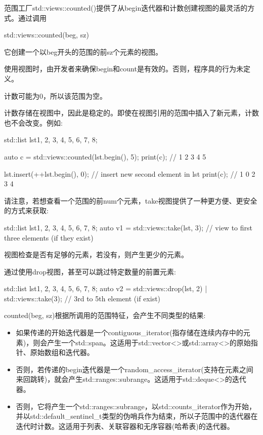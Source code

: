 
范围工厂std::views::counted()提供了从begin迭代器和计数创建视图的最灵活的方式。通过调用

\begin{cpp}
std::views::counted(beg, sz)
\end{cpp}

它创建一个以beg开头的范围的前sz个元素的视图。

使用视图时，由开发者来确保begin和count是有效的。否则，程序具的行为未定义。

计数可能为0，所以该范围为空。

计数存储在视图中，因此是稳定的。即使在视图引用的范围中插入了新元素，计数也不会改变。例如:

\begin{cpp}
std::list lst{1, 2, 3, 4, 5, 6, 7, 8};

auto c = std::views::counted(lst.begin(), 5);
print(c); // 1 2 3 4 5

lst.insert(++lst.begin(), 0); // insert new second element in lst
print(c); // 1 0 2 3 4
\end{cpp}

请注意，若想查看一个范围的前num个元素，take视图提供了一种更方便、更安全的方式来获取:

\begin{cpp}
std::list lst{1, 2, 3, 4, 5, 6, 7, 8};
auto v1 = std::views::take(lst, 3); // view to first three elements (if they exist)
\end{cpp}

视图检查是否有足够的元素，若没有，则产生更少的元素。

通过使用drop视图，甚至可以跳过特定数量的前置元素:

\begin{cpp}
std::list lst{1, 2, 3, 4, 5, 6, 7, 8};
auto v2 = std::views::drop(lst, 2) | std::views::take(3); // 3rd to 5th element (if exist)
\end{cpp}


counted(beg, sz)根据所调用的范围特征，会产生不同类型的结果:

\begin{itemize}
\item
如果传递的开始迭代器是一个contiguous\_iterator(指存储在连续内存中的元素)，则会产生一个std::span。这适用于std::vector<>或std::array<>的原始指针、原始数组和迭代器。

\item
否则，若传递的begin迭代器是一个random\_access\_iterator(支持在元素之间来回跳转)，就会产生std::ranges::subrange。这适用于std::deque<>的迭代器。

\item
否则，它将产生一个std::ranges::subrange，以std::counts\_iterator作为开始，并以std::default\_sentinel\_t类型的伪哨兵作为结束，所以子范围中的迭代器在迭代时计数。这适用于列表、关联容器和无序容器(哈希表)的迭代器。
\end{itemize}

